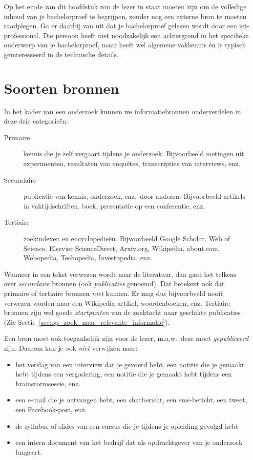 Op het einde van dit hoofdstuk zou de lezer in staat moeten zijn om de volledige inhoud van je bachelorproef te begrijpen, zonder nog een externe bron te moeten raadplegen. Ga er daarbij van uit dat je bachelorproef gelezen wordt door een ict-professional. Die persoon heeft niet noodzakelijk een achtergrond in het specifieke onderwerp van je bachelorproef, maar heeft wel algemene vakkennis én is typisch geïnteresseerd in de technische details.

\section{Soorten bronnen}%
\label{sec:soorten-bronnen}

In het kader van een onderzoek kunnen we informatiebronnen onderverdelen in deze drie categorieën:

\begin{description}
  \item[Primaire] kennis die je zelf vergaart tijdens je onderzoek. Bijvoorbeeld metingen uit experimenten, resultaten van enquêtes, transcripties van interviews, enz.
  \item[Secundaire] publicatie van kennis, onderzoek, enz.~door anderen. Bijvoorbeeld artikels in vaktijdschriften, boek, presentatie op een conferentie, enz.
  \item[Tertiaire] zoekindexen en encyclopedieën. Bijvoorbeeld Google Scholar, Web of Science, Elsevier ScienceDirect, Arxiv.org, Wikipedia, about.com, Webopedia, Techopedia, Investopedia, enz.
\end{description}

Wanneer in een tekst verwezen wordt naar de literatuur, dan gaat het telkens over \emph{secundaire} bronnen (ook \emph{publicaties} genoemd). Dat betekent ook dat primaire of tertiaire bronnen \emph{niet} kunnen. Er mag dus bijvoorbeeld nooit verwezen worden naar een Wikipedia-artikel, woordenboeken, enz. Tertiaire bronnen zijn wel goede \textit{startpunten} van de zoektocht naar geschikte publicaties (Zie Sectie~\ref{sec:op_zoek_naar_relevante_informatie}).

Een bron moet ook toegankelijk zijn voor de lezer, m.a.w.\ deze moet \textit{gepubliceerd} zijn. Daarom kan je ook \textit{niet} verwijzen naar:

\begin{itemize}
  \item het verslag van een interview dat je gevoerd hebt, een notitie die je gemaakt hebt tijdens een vergadering, een notitie die je gemaakt hebt tijdens een brainstormsessie, enz.
  \item een e-mail die je ontvangen hebt, een chatbericht, een sms-bericht, een tweet, een Facebook-post, enz.
  \item de syllabus of slides van een cursus die je tijdens je opleiding gevolgd hebt
  \item een intern document van het bedrijf dat als opdrachtgever van je onderzoek fungeert.
\end{itemize}

